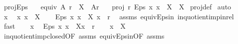 \begin{isabellebody}
\endisatagproof
{\isafoldproof}%
%
\isadelimproof
\isanewline
%
\endisadelimproof
\isanewline
{}\isamarkupfalse%
\ proj{\isacharunderscore}{\kern0pt}Eps{\isacharcolon}{\kern0pt}\isanewline
\ \ \ {\isachardoublequoteopen}equiv\ A\ r{\isachardoublequoteclose}\ \ {\isachardoublequoteopen}X\ {\isasymin}\ A{\isacharslash}{\kern0pt}{\isacharslash}{\kern0pt}r{\isachardoublequoteclose}\isanewline
\ \ \ {\isachardoublequoteopen}proj\ r\ {\isacharparenleft}{\kern0pt}Eps\ {\isacharparenleft}{\kern0pt}{\isasymlambda}x{\isachardot}{\kern0pt}\ x\ {\isasymin}\ X{\isacharparenright}{\kern0pt}{\isacharparenright}{\kern0pt}\ {\isacharequal}{\kern0pt}\ X{\isachardoublequoteclose}\isanewline
%
\isadelimproof
%
\endisadelimproof
%
\isatagproof
{}\isamarkupfalse%
\ proj{\isacharunderscore}{\kern0pt}def\isanewline
{}\isamarkupfalse%
\ auto\isanewline
\ \ \isamarkupfalse%
\ x\ \isamarkupfalse%
\ x{\isacharcolon}{\kern0pt}\ {\isachardoublequoteopen}x\ {\isasymin}\ X{\isachardoublequoteclose}\isanewline
\ \ \isamarkupfalse%
\ {\isachardoublequoteopen}{\isacharparenleft}{\kern0pt}Eps\ {\isacharparenleft}{\kern0pt}{\isasymlambda}x{\isachardot}{\kern0pt}\ x\ {\isasymin}\ X{\isacharparenright}{\kern0pt}{\isacharcomma}{\kern0pt}\ x{\isacharparenright}{\kern0pt}\ {\isasymin}\ r{\isachardoublequoteclose}\ \isamarkupfalse%
\ assms\ equiv{\isacharunderscore}{\kern0pt}Eps{\isacharunderscore}{\kern0pt}in\ in{\isacharunderscore}{\kern0pt}quotient{\isacharunderscore}{\kern0pt}imp{\isacharunderscore}{\kern0pt}in{\isacharunderscore}{\kern0pt}rel\ \isamarkupfalse%
\ fast\isanewline
{}\isamarkupfalse%
\isanewline
\ \ \isamarkupfalse%
\ x\ \isamarkupfalse%
\ {\isachardoublequoteopen}{\isacharparenleft}{\kern0pt}Eps\ {\isacharparenleft}{\kern0pt}{\isasymlambda}x{\isachardot}{\kern0pt}\ x\ {\isasymin}\ X{\isacharparenright}{\kern0pt}{\isacharcomma}{\kern0pt}x{\isacharparenright}{\kern0pt}\ {\isasymin}\ r{\isachardoublequoteclose}\isanewline
\ \ \isamarkupfalse%
\ {\isachardoublequoteopen}x\ {\isasymin}\ X{\isachardoublequoteclose}\ \isamarkupfalse%
\ in{\isacharunderscore}{\kern0pt}quotient{\isacharunderscore}{\kern0pt}imp{\isacharunderscore}{\kern0pt}closed{\isacharbrackleft}{\kern0pt}OF\ assms\ equiv{\isacharunderscore}{\kern0pt}Eps{\isacharunderscore}{\kern0pt}in{\isacharbrackleft}{\kern0pt}OF\ assms{\isacharbrackright}{\kern0pt}{\isacharbrackright}{\kern0pt}\ \isamarkupfalse%

\end{isabellebody}
